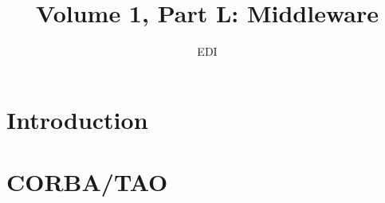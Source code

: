 \documentclass[a4paper,twoside]{scrbook}
\begin{document}
\title{Volume 1, Part L: Middleware}
\author{EDI}
\frontmatter
\maketitle
\tableofcontents
\mainmatter

\chapter{Introduction}

\chapter{CORBA/TAO}
\end{document}
